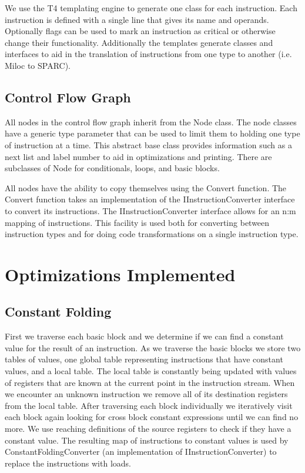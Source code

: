 \documentclass[12pt]{article}
\begin{document}
We use the T4 templating engine to generate one class for each instruction.
Each instruction is defined with a single line that gives its name and operands.
Optionally flags can be used to mark an instruction as critical or otherwise change their functionality.
Additionally the templates generate classes and interfaces to aid in the translation of instructions from one type to another (i.e. Miloc to SPARC).

\subsection{Control Flow Graph}
All nodes in the control flow graph inherit from the Node class.
The node classes have a generic type parameter that can be used to limit them to holding one type of instruction at a time.
This abstract base class provides information such as a next list and label number to aid in optimizations and printing.
There are subclasses of Node for conditionals, loops, and basic blocks.


All nodes have the ability to copy themselves using the Convert function.
The Convert function takes an implementation of the IInstructionConverter interface to convert its instructions.
The IInstructionConverter interface allows for an n:m mapping of instructions.
This facility is used both for converting between instruction types and for doing code transformations on a single instruction type.


\section{Optimizations Implemented}

\subsection{Constant Folding}
First we traverse each basic block and we determine if we can find a constant value for the result of an instruction.
As we traverse the basic blocks we store two tables of values, one global table representing instructions that have constant values, and a local table.
The local table is constantly being updated with values of registers that are known at the current point in the instruction stream.
When we encounter an unknown instruction we remove all of its destination registers from the local table.
After traversing each block individually we iteratively visit each block again looking for cross block constant expressions until we can find no more.
We use reaching definitions of the source registers to check if they have a constant value.
The resulting map of instructions to constant values is used by ConstantFoldingConverter (an implementation of IInstructionConverter)
to replace the instructions with loads.
\end{document}

